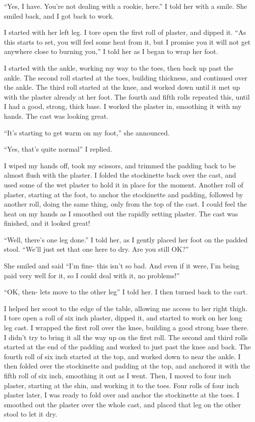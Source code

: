 ``Yes, I have. You're not dealing with a rookie, here.'' I told her with a smile. She smiled
back, and I got back to work.

I started with her left leg. I tore open the first roll of plaster, and dipped it. ``As this
starts to set, you will feel some heat from it, but I promise you it will not get anywhere close
to burning you,'' I told her as I began to wrap her foot.

I started with the ankle, working my way to the toes, then back up past the ankle. The
second roll started at the toes, building thickness, and continued over the ankle. The third
roll started at the knee, and worked down until it met up with the plaster already at her foot.
The fourth and fifth rolls repeated this, until I had a good, strong, thick base. I worked the
plaster in, smoothing it with my hands. The cast was looking great.

``It's starting to get warm on my foot,'' she announced.

``Yes, that's quite normal'' I replied.

I wiped my hands off, took my scissors, and trimmed the padding back to be almost flush with
the plaster. I folded the stockinette back over the cast, and used some of the wet plaster to
hold it in place for the moment. Another roll of plaster, starting at the foot, to anchor the
stockinette and padding, followed by another roll, doing the same thing, only from the top of
the cast. I could feel the heat on my hands as I smoothed out the rapidly setting plaster. The
cast was finished, and it looked great!

``Well, there's one leg done.'' I told her, as I gently placed her foot on the padded stool.
``We'll just set that one here to dry. Are you still OK?''

She smiled and said ``I'm fine- this isn't so bad. And even if it were, I'm being paid very
well for it, so I could deal with it, no problems!''

``OK, then- lets move to the other leg'' I told her. I then turned back to the cart.

I helped her scoot to the edge of the table, allowing me access to her right thigh. I tore
open a roll of six inch plaster, dipped it, and started to work on her long leg cast. I wrapped
the first roll over the knee, building a good strong base there. I didn't try to bring it all
the way up on the first roll. The second and third rolls started at the end of the padding and
worked to just past the knee and back. The fourth roll of six inch started at the top, and
worked down to near the ankle. I then folded over the stockinette and padding at the top, and
anchored it with the fifth roll of six inch, smoothing it out as I went. Then, I moved to four
inch plaster, starting at the shin, and working it to the toes. Four rolls of four inch plaster
later, I was ready to fold over and anchor the stockinette at the toes. I smoothed out the
plaster over the whole cast, and placed that leg on the other stool to let it dry.

